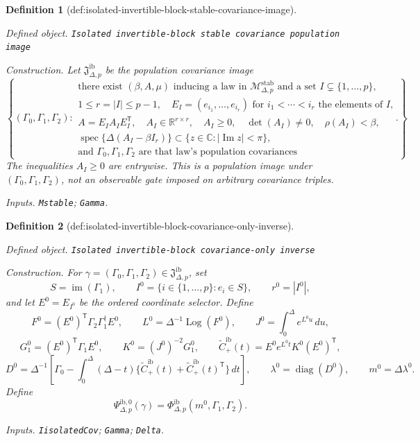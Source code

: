 \documentclass{article}
\newtheorem{definition}{Definition}
\begin{document}
\begin{definition}[def:isolated-invertible-block-stable-covariance-image]\label{def:isolated-invertible-block-stable-covariance-image}
\par\smallskip\noindent\emph{Defined object.} \texttt{Isolated invertible-\allowbreak{}block stable covariance population image}
\par\smallskip\noindent\emph{Construction.} Let \(\mathfrak J_{\Delta,p}^{\mathrm{ib}}\) be the population covariance image
\[
 \left\{(\Gamma_0,\Gamma_1,\Gamma_2):\begin{array}{l}
 \text{there exist }(\beta,A,\mu)\text{ inducing a law in }\mathcal M_{\Delta,p}^{\mathrm{stab}}\text{ and a set }I\subsetneq\{1,\ldots,p\},\\
 1\leq r=|I|\leq p-1,\quad E_I=(e_{i_1},\ldots,e_{i_r})\text{ for }i_1<\cdots<i_r\text{ the elements of }I,\\
 A=E_IA_IE_I^{\mathsf T},\quad A_I\in\mathbb R^{r\times r},\quad A_I\geq0,\quad \det(A_I)\neq0,\quad \rho(A_I)<\beta,\\
 \operatorname{spec}\{\Delta(A_I-\beta I_r)\}\subset\{z\in\mathbb C:|\operatorname{Im}z|<\pi\},\\
 \text{and }\Gamma_0,\Gamma_1,\Gamma_2\text{ are that law's population covariances}
 \end{array}\right\}.
\]
The inequalities \(A_I\geq0\) are entrywise.  This is a population image under \((\Gamma_0,\Gamma_1,\Gamma_2)\), not an observable gate imposed on arbitrary covariance triples.
\par\smallskip\noindent\emph{Inputs.} \texttt{Mstable}; \texttt{Gamma}.
\end{definition}

\begin{definition}[def:isolated-invertible-block-covariance-only-inverse]\label{def:isolated-invertible-block-covariance-only-inverse}
\par\smallskip\noindent\emph{Defined object.} \texttt{Isolated invertible-\allowbreak{}block covariance-\allowbreak{}only inverse}
\par\smallskip\noindent\emph{Construction.} For \(\gamma=(\Gamma_0,\Gamma_1,\Gamma_2)\in\mathfrak J_{\Delta,p}^{\mathrm{ib}}\), set
\[
 S=\operatorname{im}(\Gamma_1),\qquad
 I^0=\{i\in\{1,\ldots,p\}:e_i\in S\},\qquad
 r^0=|I^0|,
\]
and let \(E^0=E_{I^0}\) be the ordered coordinate selector.  Define
\[
 F^0=(E^0)^{\mathsf T}\Gamma_2\Gamma_1^\dagger E^0,\qquad
 L^0=\Delta^{-1}\operatorname{Log}(F^0),\qquad
 J^0=\int_0^\Delta e^{L^0u}\,du,
\]
\[
 G_1^0=(E^0)^{\mathsf T}\Gamma_1E^0,\qquad
 K^0=(J^0)^{-2}G_1^0,\qquad
 \widetilde C_{+}^{\mathrm{ib}}(t)=E^0e^{L^0t}K^0(E^0)^{\mathsf T},
\]
\[
 D^0=\Delta^{-1}\!\left[\Gamma_0-
 \int_0^\Delta(\Delta-t)
 \{\widetilde C_{+}^{\mathrm{ib}}(t)+\widetilde C_{+}^{\mathrm{ib}}(t)^{\mathsf T}\}\,dt\right],
 \qquad \lambda^0=\operatorname{diag}(D^0),
 \qquad m^0=\Delta\lambda^0.
\]
Define
\[
 \Psi_{\Delta,p}^{\mathrm{ib},0}(\gamma)
 =\Phi_{\Delta,p}^{\mathrm{ib}}(m^0,\Gamma_1,\Gamma_2).
\]
\par\smallskip\noindent\emph{Inputs.} \texttt{IisolatedCov}; \texttt{Gamma}; \texttt{Delta}.
\end{definition}
\end{document}
